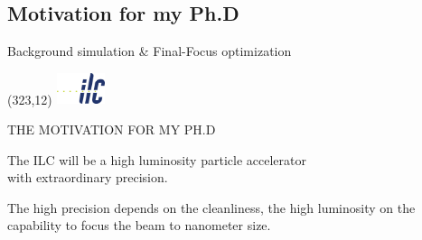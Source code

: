\documentclass[xcolor={dvipsnames}]{beamer}
\newcommand{\ilclogo}{
  \setlength{\TPHorizModule}{1pt}
  \setlength{\TPVertModule}{1pt}
  \begin{textblock}{1}(323,12)
   \includegraphics[width=40pt,height=26pt]{figures/ILC.jpeg}
  \end{textblock}
}
\begin{document}
\subsection{Motivation for my Ph.D}
\begin{frame}{Background simulation \& Final-Focus optimization}
\ilclogo
\begin{center}
 \alert{\MakeUppercase{The motivation for my Ph.D}}
\end{center}
\begin{block}{}
\centering The ILC will be a \textcolor{Periwinkle}{high luminosity} particle accelerator \\with \textcolor{JungleGreen}{extraordinary precision}.
\end{block}
\vspace*{1cm}
\textcolor{JungleGreen}{The high precision depends on the cleanliness}, \textcolor{Periwinkle}{the high luminosity on the capability to focus the beam to nanometer size}.\\
\vspace*{0.5cm}
\end{frame}
\end{document}
